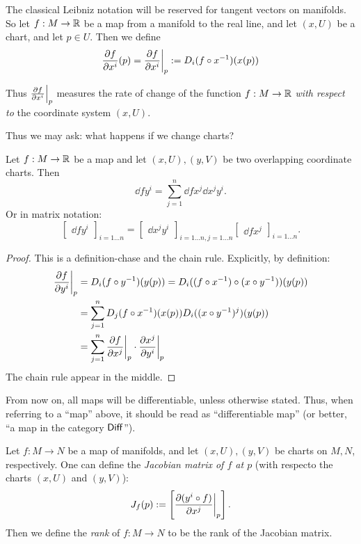 \documentclass[11pt, english]{article}
\begin{document}
The classical Leibniz notation will be reserved for tangent vectors on manifolds. So let $f:M \to \mathbb{R}$ be a map from a manifold to the real line, and let $(x,U)$ be a chart, and let $p \in U$. Then we define
\[
\frac{\partial f}{\partial  x^i} (p) = \restr{\frac{\partial f}{\partial x^i}}p := D_i(f \circ x^{-1})(x(p))
\]

Thus $\restr{\frac{\partial f}{\partial x^i}}p$ measures the rate of change of the function $f:M \to \mathbb{R}$ \emph{with respect to} the coordinate system $(x,U)$.

Thus we may ask: what happens if we change charts?
\begin{prop}
Let $f:M \to \mathbb{R}$ be a map and let $(x,U),(y,V)$ be two overlapping coordinate charts. Then
\[
\dd{f}{y^i} = \sum_{j=1}^n \dd f{x^j} \dd{x^j}{y^i}.
\]
Or in matrix notation:
\[
\begin{bmatrix}
\dd f{y^i}
\end{bmatrix}_{i=1\dotsc n} = \begin{bmatrix} \dd{x^j}{y^i} \end{bmatrix}_{i=1\dotsc n, j=1\dotsc n} \begin{bmatrix} \dd f {x^j} \end{bmatrix}_{i=1 \dotsc n}.
\]
\end{prop}
\begin{proof}
This is a definition-chase and the chain rule. Explicitly, by definition:
\begin{align*}
 \restr{\dd{f}{y^i}}{p} &= D_i(f \circ y^{-1})(y(p)) = D_i((f \circ x^{-1}) \circ (x \circ y^{-1}))(y(p)) \\
&= \sum
_{j=1}^n D_j(f \circ x^{-1})(x(p)) D_i((x \circ y^{-1})^j)(y(p)) \\
&= \sum_{j=1}^n \restr{\dd{f}{x^j}}{p} \cdot  \restr{\dd{x^j}{y^i}}{p}
\end{align*}
The chain rule appear in the middle.
\end{proof}
\begin{remark}
From now on, all maps will be differentiable, unless otherwise stated. Thus, when referring to a ``map'' above, it should be read as ``differentiable map'' (or better, ``a map in the category $\mathsf{Diff}$'').
\end{remark}

Let $f:M \to N$ be a map of manifolds, and let $(x,U),(y,V)$ be charts on $M,N$, respectively. One can define the \emph{Jacobian matrix of $f$ at $p$} (with respecto the charts $(x,U)$ and $(y,V)$):
\[
J_f(p) := \left[ \restr{\dd{(y^i \circ f)}{x^j}}p \right].
\]
Then we define the \emph{rank} of $f:M \to N$ to be the rank of the Jacobian matrix.
\end{document}
